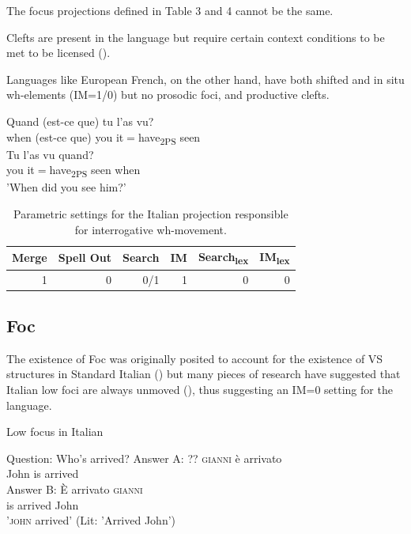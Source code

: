 \documentclass[fleqn,10pt]{wlscirep}
\begin{document}
\noindent The focus projections defined in Table 3 and 4 cannot be the same.

\noindent Clefts are present in the language but require certain context conditions to be met to be licensed (\citealt{larrive2022}). 

\noindent Languages like European French, on the other hand, have both shifted and in situ wh-elements (IM=1/0) but no prosodic foci, and productive clefts. 

\begin{exe}
    \ex
        \begin{xlist}
            \ex  \gll Quand (est-ce que) tu l'as vu?\\
            when (est-ce que) you it$=$have\textsubscript{2PS} seen\\
            \ex  \gll Tu l'as vu quand?\\
            you it$=$have\textsubscript{2PS} seen when\\
            \glt 'When did you see him?'
        \end{xlist}
\end{exe}

\begin{table}[H]
    \centering
    \begin{tabular}{|r|r|r|r|r|r|}
    \hline
    Merge & Spell Out & Search & IM & Search\textsubscript{lex} & IM\textsubscript{lex} \\
    \hline
    1 & 0 & 0/1 & 1 & 0 & 0 \\
    \hline
    \end{tabular}
    \caption{\label{tab:samp}Parametric settings for the Italian projection responsible for interrogative wh-movement.}
\end{table}

\subsection*{Foc}

The existence of Foc was originally posited to account for the existence of VS structures in Standard Italian (\citealt{belletti2004}) but many pieces of research have suggested that Italian low foci are always unmoved (\citealt{cardinaletti2001,sameklodovici15,bonan21}), thus suggesting an IM=0 setting for the language. 

\begin{exe}
    \ex Low focus in Italian
    \begin{xlist}
    \ex Question: Who's arrived?
    \ex \gll Answer A: ?? \textsc{gianni} è arrivato\\
    {} {} {} John is arrived\\
    \ex \gll Answer B: È arrivato \textsc{gianni}\\
    {} {} is arrived John\\ 
    \glt \hspace{16mm} '\textsc{john} arrived' (Lit: 'Arrived John')
    \end{xlist}
\end{exe}
\end{document}
